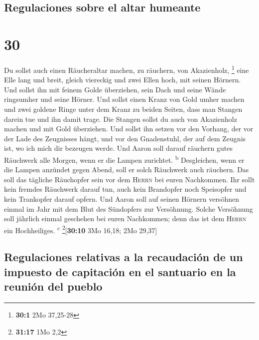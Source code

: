 \hypertarget{regulaciones-sobre-el-altar-humeante}{%
\subsection{Regulaciones sobre el altar
humeante}\label{regulaciones-sobre-el-altar-humeante}}

\hypertarget{section-29}{%
\section{30}\label{section-29}}

 Du sollst auch einen Räucheraltar machen, zu räuchern,
von Akazienholz, \footnote{\textbf{30:1} 2Mo 37,25-28} 
eine Elle lang und breit, gleich viereckig und zwei Ellen hoch, mit
seinen Hörnern.  Und sollst ihn mit feinem Golde
überziehen, sein Dach und seine Wände ringsumher und seine Hörner. Und
sollst einen Kranz von Gold umher machen  und zwei goldene
Ringe unter dem Kranz zu beiden Seiten, dass man Stangen darein tue und
ihn damit trage.  Die Stangen sollst du auch von
Akazienholz machen und mit Gold überziehen.  Und sollst
ihn setzen vor den Vorhang, der vor der Lade des Zeugnisses hängt, und
vor den Gnadenstuhl, der auf dem Zeugnis ist, wo ich mich dir bezeugen
werde.  Und Aaron soll darauf räuchern gutes Räuchwerk
alle Morgen, wenn er die Lampen zurichtet. \textsuperscript{b}
 Desgleichen, wenn er die Lampen anzündet gegen Abend,
soll er solch Räuchwerk auch räuchern. Das soll das tägliche Räuchopfer
sein vor dem \textsc{Herrn} bei euren Nachkommen.  Ihr
sollt kein fremdes Räuchwerk darauf tun, auch kein Brandopfer noch
Speisopfer und kein Trankopfer darauf opfern.  Und Aaron
soll auf seinen Hörnern versöhnen einmal im Jahr mit dem Blut des
Sündopfers zur Versöhnung. Solche Versöhnung soll jährlich einmal
geschehen bei euren Nachkommen; denn das ist dem \textsc{Herrn} ein
Hochheiliges. \textsuperscript{c} \footnote{\textbf{31:17} 1Mo 2,2}{[}\textbf{30:10}
3Mo 16,18; 2Mo 29,37{]}

\hypertarget{regulaciones-relativas-a-la-recaudaciuxf3n-de-un-impuesto-de-capitaciuxf3n-en-el-santuario-en-la-reuniuxf3n-del-pueblo}{%
\subsection{Regulaciones relativas a la recaudación de un impuesto de
capitación en el santuario en la reunión del
pueblo}\label{regulaciones-relativas-a-la-recaudaciuxf3n-de-un-impuesto-de-capitaciuxf3n-en-el-santuario-en-la-reuniuxf3n-del-pueblo}}

